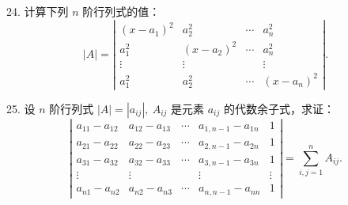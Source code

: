 \documentclass[UTF8, 12pt, fontset=fandol, oneside]{ctexart}
\begin{document}
24. 计算下列 $n$ 阶行列式的值：
\[
|A|=
\left|\begin{array}{cccc}
(x-a_1)^2&a_2^2&\cdots&a_n^2\\
a_1^2&(x-a_2)^2&\cdots&a_n^2\\
\vdots&\vdots&&\vdots\\
a_1^2&a_2^2&\cdots&(x-a_n)^2
\end{array}\right|.
\]

25. 设 $n$ 阶行列式 $|A|=|a_{ij}|,\ A_{ij}$ 是元素 $a_{ij}$ 的代数余子式，求证：
\[
\left|\begin{array}{ccccc}
a_{11}-a_{12}&a_{12}-a_{13}&\cdots&a_{1,n-1}-a_{1n}&1\\
a_{21}-a_{22}&a_{22}-a_{23}&\cdots&a_{2,n-1}-a_{2n}&1\\
a_{31}-a_{32}&a_{32}-a_{33}&\cdots&a_{3,n-1}-a_{3n}&1\\
\vdots&\vdots&&\vdots&\vdots\\
a_{n1}-a_{n2}&a_{n2}-a_{n3}&\cdots&a_{n,n-1}-a_{nn}&1
\end{array}\right|
=\sum_{i,j=1}^n A_{ij}.
\]
\end{document}
